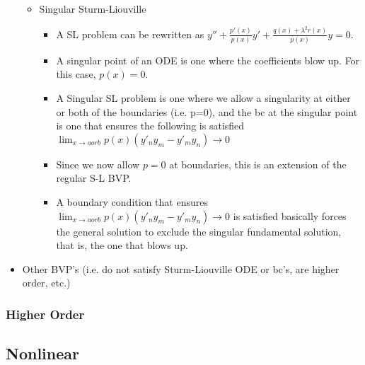 \documentclass[a4paper,12pt]{article}
\begin{document}
\begin{itemize}
\begin{itemize}
		\item Singular Sturm-Liouville
			\begin{itemize}
			\item A SL problem can be rewritten as $y''+\frac{p'(x)}{p(x)}y'+\frac{q(x)+\lambda^2r(x)}{p(x)}y=0$.
			\item A singular point of an ODE is one where the coefficients blow up. For this case, $p(x) = 0$.
			\item A Singular SL problem is one where we allow a singularity at either or both of the boundaries (i.e. p=0), and the bc at the singular point is one that ensures the following is satisfied $\lim_{x \to a or b} p(x)(y'_ny_m-y'_my_n)\to0$ 
			\item Since we now allow $p=0$ at boundaries, this is an extension of the regular S-L BVP.
			\item A boundary condition that ensures $\lim_{x \to a or b} p(x)(y'_ny_m-y'_my_n)\to0$  is satisfied basically forces the general solution to exclude the singular fundamental solution, that is, the one that blows up.
			\end{itemize}
		\end{itemize}
	\item Other BVP's (i.e. do not satisfy Sturm-Liouville ODE or bc's, are higher order, etc.)
	\end{itemize}
\subsubsection{Higher Order}
\subsection{Nonlinear}
\end{document}
